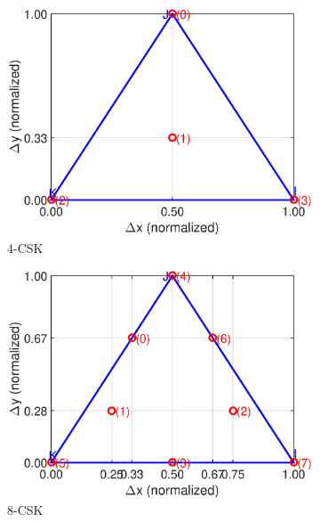 \documentclass[10pt,letterpaper]{article}
\begin{document}
\begin{figure}[b]
	\centering
		\begin{subfigure}{0.32\textwidth}
		\centering
			\includegraphics[trim={0.05in 0.0in 0.25in 0.2in}, clip=true, width=\textwidth]{CBCrules4.eps}
			\caption{4-CSK}
			\label{fig4Const}
		\end{subfigure}
		\hfill
		\begin{subfigure}{0.32\textwidth}
		\centering
			\includegraphics[trim={0.05in 0.0in 0.25in 0.2in}, clip=true, width=\textwidth]{CBCrules8.eps}
			\caption{8-CSK}
			\label{fig8Const}
		\end{subfigure}
		\hfill
		\begin{subfigure}{0.32\textwidth}
		\centering

\end{subfigure}
\end{figure}
\end{document}
